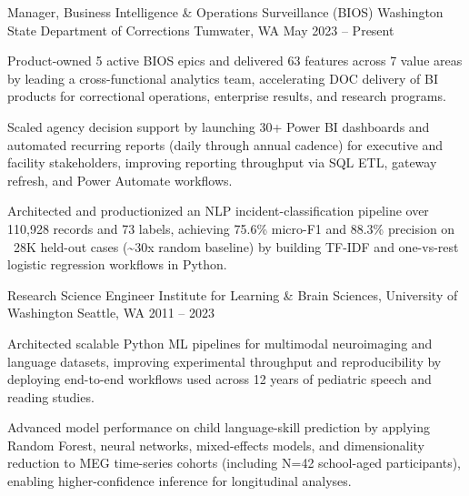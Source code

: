 
\begin{cventries}

    \cventry
    {Manager, Business Intelligence \& Operations Surveillance (BIOS)}
    {Washington State Department of Corrections}
    {Tumwater, WA}
    {May 2023 -- Present}
    {
      \begin{cvitems}
        \item Product-owned 5 active BIOS epics and delivered 63 features across 7 value areas by leading a cross-functional analytics team, accelerating DOC delivery of BI products for correctional operations, enterprise results, and research programs.
        \item Scaled agency decision support by launching 30+ Power BI dashboards and automated recurring reports (daily through annual cadence) for executive and facility stakeholders, improving reporting throughput via SQL ETL, gateway refresh, and Power Automate workflows.
        \item Architected and productionized an NLP incident-classification pipeline over 110,928 records and 73 labels, achieving 75.6\% micro-F1 and 88.3\% precision on ~28K held-out cases (\textasciitilde30x random baseline) by building TF-IDF and one-vs-rest logistic regression workflows in Python.
      \end{cvitems}
    }
  \cventry
    {Research Science Engineer}
    {Institute for Learning \& Brain Sciences, University of Washington}
    {Seattle, WA}
    {2011 -- 2023}
    {
      \begin{cvitems}
        \item Architected scalable Python ML pipelines for multimodal neuroimaging and language datasets, improving experimental throughput and reproducibility by deploying end-to-end workflows used across 12 years of pediatric speech and reading studies.
        \item Advanced model performance on child language-skill prediction by applying Random Forest, neural networks, mixed-effects models, and dimensionality reduction to MEG time-series cohorts (including N=42 school-aged participants), enabling higher-confidence inference for longitudinal analyses.

\end{cvitems}}
\end{cventries}
